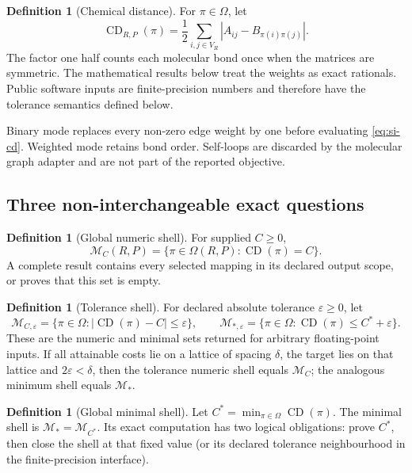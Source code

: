 \documentclass[11pt]{article}
\theoremstyle{definition}
\newtheorem{definition}[theorem]{Definition}
\newcommand{\CD}{\operatorname{CD}}
\begin{document}
\begin{definition}[Chemical distance]
For \(\pi\in\Omega\), let
\begin{equation}
 \CD_{R,P}(\pi)=\frac12\sum_{i,j\in V_R}
 \left|A_{ij}-B_{\pi(i)\pi(j)}\right|.
 \label{eq:si-cd}
\end{equation}
The factor one half counts each molecular bond once when the matrices are
symmetric.  The mathematical results below treat the weights as exact
rationals.  Public software inputs are finite-precision numbers and therefore
have the tolerance semantics defined below.
\end{definition}

Binary mode replaces every non-zero edge weight by one before evaluating
\cref{eq:si-cd}.  Weighted mode retains bond order.  Self-loops are discarded
by the molecular graph adapter and are not part of the reported objective.

\subsection{Three non-interchangeable exact questions}

\begin{definition}[Global numeric shell]
For supplied \(C\geq0\),
\[
 \mathcal M_C(R,P)=\{\pi\in\Omega(R,P):\CD(\pi)=C\}.
\]
A complete result contains every selected mapping in its declared output
scope, or proves that this set is empty.
\end{definition}

\begin{definition}[Tolerance shell]
For declared absolute tolerance $\varepsilon\geq0$, let
\[
 \mathcal M_{C,\varepsilon}
 =\{\pi\in\Omega:|\CD(\pi)-C|\leq\varepsilon\},\qquad
 \mathcal M_{*,\varepsilon}
 =\{\pi\in\Omega:\CD(\pi)\leq C^*+\varepsilon\}.
\]
These are the numeric and minimal sets returned for arbitrary floating-point
inputs.  If all attainable costs lie on a lattice of spacing $\delta$, the
target lies on that lattice and $2\varepsilon<\delta$, then the tolerance
numeric shell equals $\mathcal M_C$; the analogous minimum shell equals
$\mathcal M_*$.
\end{definition}

\begin{definition}[Global minimal shell]
Let \(C^*=\min_{\pi\in\Omega}\CD(\pi)\).  The minimal shell is
\(
 \mathcal M_*=\mathcal M_{C^*}
\).
Its exact computation has two logical obligations: prove \(C^*\), then close
the shell at that fixed value (or its declared tolerance neighbourhood in the
finite-precision interface).
\end{definition}
\end{document}
